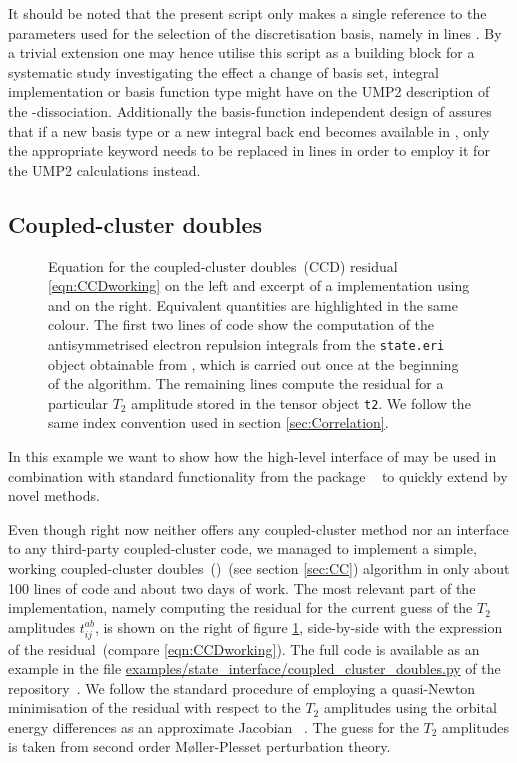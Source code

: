 It should be noted
that the present script only makes a single reference to the
parameters used for the selection of the discretisation basis,
namely in lines \ldict.
By a trivial extension one may hence utilise
this script as a building block for a systematic study
investigating the effect
a change of basis set, integral implementation or basis function type
might have on the UMP2 description of the -dissociation.
Additionally the basis-function independent design of \molsturm
assures that if a new basis type or a new integral back end
becomes available in \gint,
only the appropriate keyword needs to be replaced in lines \ldict
in order to employ it for the UMP2 calculations instead.

\subsection{Coupled-cluster doubles}
\label{sec:ex:ccd}

\begin{figure}
	
	\caption[Coupled-cluster doubles residual equation and implementation side-by-side]
	{Equation for the coupled-cluster doubles~(CCD)
		residual \eqref{eqn:CCDworking}
		on the left and excerpt of a \CCD implementation
		using \molsturm and \numpy on the right.
		Equivalent quantities are highlighted in the same colour.
		The first two lines of code show the computation of the
		antisymmetrised electron repulsion integrals
		from the \texttt{state.eri} object obtainable from \molsturm,
		which is carried out once at the beginning of the algorithm.
		The remaining lines compute the residual for
		a particular $T_2$ amplitude stored in the tensor object
		\texttt{t2}.
		We follow the same index convention
		used in section \vref{sec:Correlation}.
	}
	\label{fig:codeCCD}
\end{figure}

In this example we want to show how the
high-level \python interface of \molsturm may be used
in combination with standard functionality from the \python
package \numpy~\cite{Walt2011,scipyWeb} to quickly extend
\molsturm by novel methods.

Even though \molsturm right now neither offers
any coupled-cluster method nor
an interface to any third-party coupled-cluster code,
we managed to implement a simple, working
coupled-cluster doubles~(\CCD)~(see section \vref{sec:CC}) algorithm
in only about 100 lines of code and about two days of work.
The most relevant part of the implementation,
namely computing the \CCD residual for the current guess
of the $T_2$ amplitudes $t_{ij}^{ab}$,
is shown on the right of figure \ref{fig:codeCCD},
side-by-side with the expression of the \CCD residual~(compare \eqref{eqn:CCDworking}).
The full \CCD code is available as an example
in the file \url{examples/state_interface/coupled_cluster_doubles.py}
of the \molsturm repository~\cite{molsturmWeb}.
We follow the standard procedure
of employing a quasi-Newton minimisation
of the \CCD residual with respect to the $T_2$ amplitudes
using the orbital energy differences as an approximate Jacobian%
~\cite{Bartlett1978,Helgaker2013}.
The guess for the $T_2$ amplitudes is taken
from second order Møller-Plesset perturbation theory.

